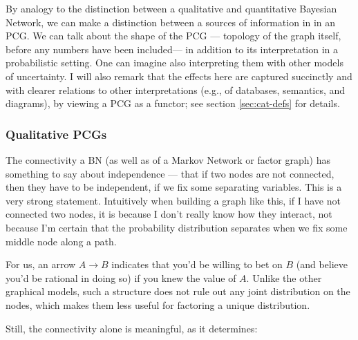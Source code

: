 \documentclass{article}
\begin{document}
	By analogy to the distinction between a qualitative and quantitative Bayesian Network, 	
	we can make a distinction between a sources of information in in an PCG. We can talk about the shape of the PCG --- topology of the graph itself, before any numbers have been included--- in addition to its interpretation in a probabilistic setting. One can imagine also interpreting them with other models of uncertainty.  I will also remark that the effects here are captured succinctly and with clearer relations to other interpretations (e.g., of databases, semantics, and diagrams), by viewing a PCG as a functor; see section \ref{sec:cat-defs} for details. 
	
	\subsubsection{Qualitative PCGs} The connectivity a BN (as well as of a Markov Network or factor graph) has something to say about independence --- that if two nodes are not connected, then they have to be independent, if we fix some separating variables. This is a very strong statement. Intuitively when building a graph like this, if I have not connected two nodes, it is because I don't really know how they interact, not because I'm certain that the probability distribution separates when we fix some middle node along a path.
	
	For us, an arrow $A \to B$ indicates that you'd be willing to bet on $B$ (and believe you'd be rational in doing so) if you knew the value of $A$. Unlike the other graphical models, such a structure does not rule out any joint distribution on the nodes, which makes them less useful for factoring a unique distribution. 
	
	Still, the connectivity alone is meaningful, as it determines:	
	
\end{document}
